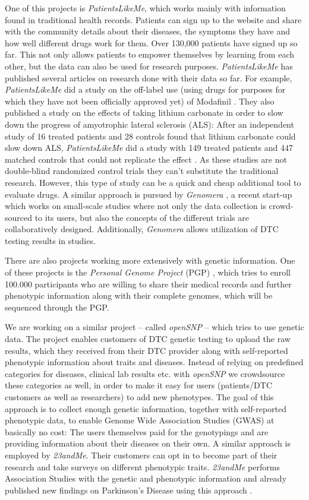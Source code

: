 \documentclass[runningheads,a4paper]{llncs}
\begin{document}
One of this projects is \emph{PatientsLikeMe}, which works mainly with information found in traditional health records. Patients can sign up to the website and share with the community details about their diseases, the symptoms they have and how well different drugs work for them. Over 130,000 patients have signed up so far. This not only allows patients to empower themselves by learning from each other, but the data can also be used for research purposes. \emph{PatientsLikeMe} has published several articles on research done with their data so far. For example, \emph{PatientsLikeMe} did a study on the off-label use (using drugs for purposes for which they have not been officially approved yet) of Modafinil \cite{frost}. They also published a study on the effects of taking lithium carbonate in order to slow down the progress of amyotrophic lateral sclerosis (ALS): After an independent study of 16 treated patients and 28 controls found that lithium carbonate could slow down ALS, \emph{PatientsLikeMe} did a study with 149 treated patients and 447 matched controls that could not replicate the effect \cite{wicks}. As these studies are not double-blind randomized control trials they can't substitute the traditional research. However, this type of study can be a quick and cheap additional tool to evaluate drugs. A similar approach is pursued by \emph{Genomera} \cite{genomera}, a recent start-up which works on small-scale studies where not only the data collection is crowd-sourced to its users, but also the concepts of the different trials are collaboratively designed. Additionally, \emph{Genomera} allows utilization of DTC testing results in studies.

There are also projects working more extensively with genetic information. One of these projects is the \emph{Personal Genome Project} (PGP) \cite{pgp}, which tries to enroll 100.000 participants who are willing to share their medical records and further phenotypic information along with their complete genomes, which will be sequenced through the PGP. 

We are working on a similar project – called \emph{openSNP} \cite{opensnp} – which tries to use genetic data. The project enables customers of DTC genetic testing to upload the raw results, which they received from their DTC provider along with self-reported phenotypic information about traits and diseases. Instead of relying on predefined categories for diseases, clinical lab results etc. with \emph{openSNP} we crowdsource these categories as well, in order to make it easy for users (patients/DTC customers as well as researchers) to add new phenotypes. The goal of this approach is to collect enough genetic information, together with self-reported phenotypic data, to enable Genome Wide Association Studies (GWAS) at basically no cost: The users themselves paid for the genotypings and are providing information about their diseases on their own. A similar approach is employed by \emph{23andMe}. Their customers can opt in to become part of their research and take surveys on different phenotypic traits. \emph{23andMe} performs Association Studies with the genetic and phenotypic information and already published new findings on Parkinson's Disease using this approach \cite{23andme3}.
\end{document}
